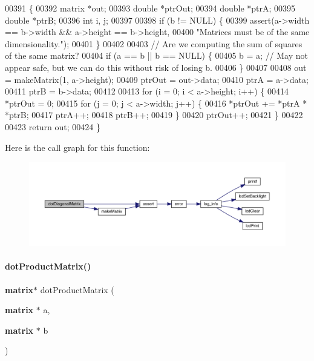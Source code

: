 \begin{DoxyCode}
00391                                                 \{
00392   matrix *out;
00393   \textcolor{keywordtype}{double} *ptrOut;
00394   \textcolor{keywordtype}{double} *ptrA;
00395   \textcolor{keywordtype}{double} *ptrB;
00396   \textcolor{keywordtype}{int} i, j;
00397 
00398   \textcolor{keywordflow}{if} (b != NULL) \{
00399     assert(a->width == b->width && a->height == b->height,
00400            \textcolor{stringliteral}{"Matrices must be of the same dimensionality."});
00401   \}
00402 
00403   \textcolor{comment}{// Are we computing the sum of squares of the same matrix?}
00404   \textcolor{keywordflow}{if} (a == b || b == NULL) \{
00405     b = a; \textcolor{comment}{// May not appear safe, but we can do this without risk of losing b.}
00406   \}
00407 
00408   out = makeMatrix(1, a->height);
00409   ptrOut = out->data;
00410   ptrA = a->data;
00411   ptrB = b->data;
00412 
00413   \textcolor{keywordflow}{for} (i = 0; i < a->height; i++) \{
00414     *ptrOut = 0;
00415     \textcolor{keywordflow}{for} (j = 0; j < a->width; j++) \{
00416       *ptrOut += *ptrA * *ptrB;
00417       ptrA++;
00418       ptrB++;
00419     \}
00420     ptrOut++;
00421   \}
00422 
00423   \textcolor{keywordflow}{return} out;
00424 \}
\end{DoxyCode}
Here is the call graph for this function\+:
\nopagebreak
\begin{figure}[H]
\begin{center}
\leavevmode
\includegraphics[width=350pt]{matrix_8h_af49b525d7476c365833db9acd975e3a5_cgraph}
\end{center}
\end{figure}
\mbox{\label{matrix_8h_a0b568a64e81a56779c2141b424475976}} 
\paragraph{dot\+Product\+Matrix()}
{\footnotesize\ttfamily \textbf{ matrix}$\ast$ dot\+Product\+Matrix (\begin{DoxyParamCaption}\item[{\textbf{ matrix} $\ast$}]{a,  }\item[{\textbf{ matrix} $\ast$}]{b }\end{DoxyParamCaption})}



